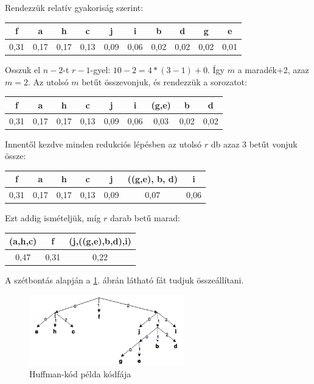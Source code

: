 \documentclass[margin=0px]{article}
\begin{document}
\begin{description}
        Rendezzük relatív gyakoriság szerint:

        \begin{tabular}{|c|c|c|c|c|c|c|c|c|c|}
            \hline f    & a    & h    & c    & j    & i    & b    & d    & g    & e    \\
            \hline 0,31 & 0,17 & 0,17 & 0,13 & 0,09 & 0,06 & 0,02 & 0,02 & 0,02 & 0,01 \\
            \hline
        \end{tabular}

        Osszuk el $n-2$-t $r-1$-gyel: $10-2 = 4*(3-1)+0$. Így $m$ a maradék+2, azaz $m=2$.
        Az utolsó $m$ betűt összevonjuk, és rendezzük a sorozatot:

        \begin{tabular}{|c|c|c|c|c|c|c|c|c|}
            \hline f    & a    & h    & c    & j    & i    & (g,e) & b    & d    \\
            \hline 0,31 & 0,17 & 0,17 & 0,13 & 0,09 & 0,06 & 0,03  & 0,02 & 0,02 \\
            \hline
        \end{tabular}

        Innentől kezdve minden redukciós lépésben az utolsó $r$ db azaz 3 betűt vonjuk össze:

        \begin{tabular}{|c|c|c|c|c|c|c|}
            \hline f    & a    & h    & c    & j    & ((g,e), b, d) & i    \\
            \hline 0,31 & 0,17 & 0,17 & 0,13 & 0,09 & 0,07          & 0,06 \\
            \hline
        \end{tabular}

        Ezt addig ismételjük, míg $r$ darab betű marad:

        \begin{tabular}{|c|c|c|}
            \hline (a,h,c) & f    & (j,((g,e),b,d),i) \\
            \hline 0,47    & 0,31 & 0,22              \\
            \hline
        \end{tabular}

        A szétbontás alapján a \ref{fig:huffmann_split}. ábrán látható fát tudjuk összeállítani.

        \begin{figure}[H]
            \centering
            \includegraphics[width=0.6\textwidth]{img/huffmann_split.png}
            \caption{Huffman-kód példa kódfája}
            \label{fig:huffmann_split}
        \end{figure}


\end{description}
\end{document}
